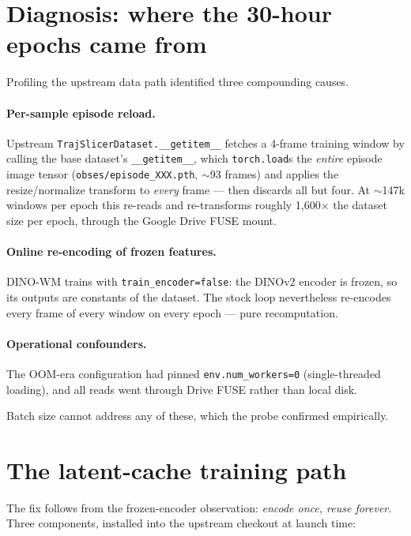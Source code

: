 \documentclass[11pt]{article}
\begin{document}
\section{Diagnosis: where the 30-hour epochs came from}
\label{sec:diagnosis}

Profiling the upstream data path identified three compounding causes.

\paragraph{Per-sample episode reload.} Upstream
\texttt{TrajSlicerDataset.\_\_getitem\_\_} fetches a 4-frame training window
by calling the base dataset's \texttt{\_\_getitem\_\_}, which
\texttt{torch.load}s the \emph{entire} episode image tensor
(\texttt{obses/episode\_XXX.pth}, $\sim$93 frames) and applies the
resize/normalize transform to \emph{every} frame --- then discards all but
four. At $\sim$147k windows per epoch this re-reads and re-transforms roughly
1{,}600$\times$ the dataset size per epoch, through the Google Drive FUSE
mount.

\paragraph{Online re-encoding of frozen features.} DINO-WM trains with
\texttt{train\_encoder=false}: the DINOv2 encoder is frozen, so its outputs
are constants of the dataset. The stock loop nevertheless re-encodes every
frame of every window on every epoch --- pure recomputation.

\paragraph{Operational confounders.} The OOM-era configuration had pinned
\texttt{env.num\_workers=0} (single-threaded loading), and all reads went
through Drive FUSE rather than local disk.

Batch size cannot address any of these, which the probe confirmed empirically.

\section{The latent-cache training path}
\label{sec:latent}

The fix follows from the frozen-encoder observation: \emph{encode once, reuse
forever}. Three components, installed into the upstream checkout at launch
time:
\end{document}
